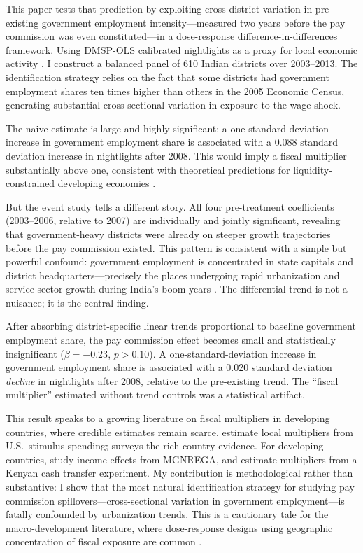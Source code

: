 \documentclass[12pt]{article}
\begin{document}
This paper tests that prediction by exploiting cross-district variation in pre-existing government employment intensity---measured two years before the pay commission was even constituted---in a dose-response difference-in-differences framework. Using DMSP-OLS calibrated nightlights as a proxy for local economic activity \citep{Henderson2012, Donaldson2016}, I construct a balanced panel of 610 Indian districts over 2003--2013. The identification strategy relies on the fact that some districts had government employment shares ten times higher than others in the 2005 Economic Census, generating substantial cross-sectional variation in exposure to the wage shock.

The naive estimate is large and highly significant: a one-standard-deviation increase in government employment share is associated with a 0.088 standard deviation increase in nightlights after 2008. This would imply a fiscal multiplier substantially above one, consistent with theoretical predictions for liquidity-constrained developing economies \citep{FarrierMendoza2014}.

But the event study tells a different story. All four pre-treatment coefficients (2003--2006, relative to 2007) are individually and jointly significant, revealing that government-heavy districts were already on steeper growth trajectories before the pay commission existed. This pattern is consistent with a simple but powerful confound: government employment is concentrated in state capitals and district headquarters---precisely the places undergoing rapid urbanization and service-sector growth during India's boom years \citep{Hnatkovska2012}. The differential trend is not a nuisance; it is the central finding.

After absorbing district-specific linear trends proportional to baseline government employment share, the pay commission effect becomes small and statistically insignificant ($\beta = -0.23$, $p > 0.10$). A one-standard-deviation increase in government employment share is associated with a 0.020 standard deviation \textit{decline} in nightlights after 2008, relative to the pre-existing trend. The ``fiscal multiplier'' estimated without trend controls was a statistical artifact.

This result speaks to a growing literature on fiscal multipliers in developing countries, where credible estimates remain scarce. \citet{Suarez2016} estimate local multipliers from U.S.\ stimulus spending; \citet{Chodorow2019} surveys the rich-country evidence. For developing countries, \citet{Muralidharan2023} study income effects from MGNREGA, and \citet{Egger2022} estimate multipliers from a Kenyan cash transfer experiment. My contribution is methodological rather than substantive: I show that the most natural identification strategy for studying pay commission spillovers---cross-sectional variation in government employment---is fatally confounded by urbanization trends. This is a cautionary tale for the macro-development literature, where dose-response designs using geographic concentration of fiscal exposure are common \citep{Clemens2012}.
\end{document}

